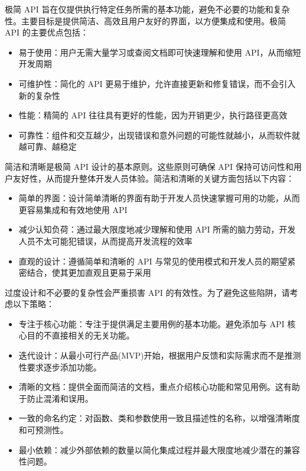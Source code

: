极简 API 旨在仅提供执行特定任务所需的基本功能，避免不必要的功能和复杂性。主要目标是提供简洁、高效且用户友好的界面，以方便集成和使用。极简 API 的主要优点包括：

\begin{itemize}
\item
易于使用：用户无需大量学习或查阅文档即可快速理解和使用 API，从而缩短开发周期

\item
可维护性：简化的 API 更易于维护，允许直接更新和修复错误，而不会引入新的复杂性

\item
性能：精简的 API 往往具有更好的性能，因为开销更少，执行路径更高效

\item
可靠性：组件和交互越少，出现错误和意外问题的可能性就越小，从而软件就越可靠、越稳定
\end{itemize}

简洁和清晰是极简 API 设计的基本原则。这些原则可确保 API 保持可访问性和用户友好性，从而提升整体开发人员体验。简洁和清晰的关键方面包括以下内容：

\begin{itemize}
\item
简单的界面：设计简单清晰的界面有助于开发人员快速掌握可用的功能，从而更容易集成和有效地使用 API

\item
减少认知负荷：通过最大限度地减少理解和使用 API 所需的脑力劳动，开发人员不太可能犯错误，从而提高开发流程的效率

\item
直观的设计：遵循简单和清晰的 API 与常见的使用模式和开发人员的期望紧密结合，使其更加直观且更易于采用
\end{itemize}

过度设计和不必要的复杂性会严重损害 API 的有效性。为了避免这些陷阱，请考虑以下策略：

\begin{itemize}
\item
专注于核心功能：专注于提供满足主要用例的基本功能。避免添加与 API 核心目的不直接相关的无关功能。

\item
迭代设计：从最小可行产品(MVP)开始，根据用户反馈和实际需求而不是推测性要求逐步添加功能。

\item
清晰的文档：提供全面而简洁的文档，重点介绍核心功能和常见用例。这有助于防止混淆和误用。

\item
一致的命名约定：对函数、类和参数使用一致且描述性的名称，以增强清晰度和可预测性。

\item
最小依赖：减少外部依赖的数量以简化集成过程并最大限度地减少潜在的兼容性问题。
\end{itemize}









